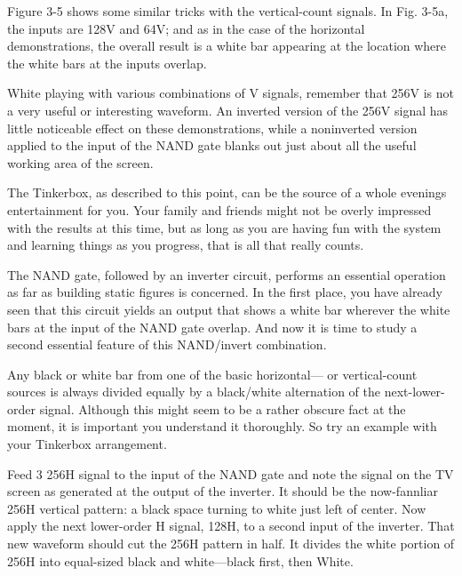 \documentclass[11pt]{book}              %
\begin{document}
Figure 3-5 shows some similar tricks with the vertical-count signals. In Fig. 3-5a, the inputs are 128V and 64V; and as in the case of the horizontal demonstrations, the overall result is a white bar appearing at the location where the white bars at the inputs overlap.

White playing with various combinations of V signals, remember that 256V is not a very useful or interesting waveform. An inverted version of the 256V signal has little noticeable effect on these demonstrations, while a noninverted version applied to the input of the NAND gate blanks out just about all the useful working area of the screen.

The Tinkerbox, as described to this point, can be the source of a whole evenings entertainment for you. Your family and friends might not be overly impressed with the results at this time, but as long as you are having fun with the system and learning things as you progress, that is all that really counts.


The NAND gate, followed by an inverter circuit, performs an essential operation as far as building static figures is concerned. In the first place, you have already seen that this circuit yields an output that shows a white bar wherever the white bars at the input of the NAND gate overlap. And now it is time to study a second essential feature of this NAND/invert combination.

Any black or white bar from one of the basic horizontal— or vertical-count sources is always divided equally by a black/white alternation of the next-lower-order signal. Although this might seem to be a rather obscure fact at the moment, it is important you understand it thoroughly. So try an example with your Tinkerbox arrangement.

Feed 3 256H signal to the input of the NAND gate and note the signal on the TV screen as generated at the output of the inverter. It should be the now-fannliar 256H vertical pattern: a black space turning to white just left of center. Now apply the next lower-order H signal, 128H, to a second input of the inverter. That new waveform should cut the 256H pattern in half. It divides the white portion of 256H into equal-sized black and white—black first, then White.
\end{document}
